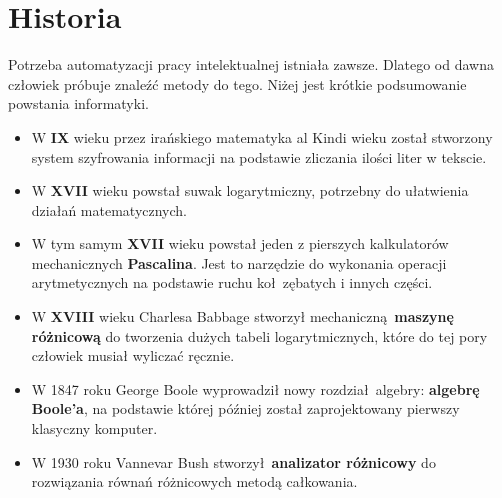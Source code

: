\section{Historia}
	
	Potrzeba automatyzacji pracy intelektualnej istniała zawsze. Dlatego od dawna człowiek próbuje
	znaleźć metody do tego. Niżej jest krótkie podsumowanie powstania informatyki.
	\\

	\begin{itemize}
		\item W \textbf{IX} wieku
			przez irańskiego matematyka al Kindi wieku został stworzony system szyfrowania informacji na
			podstawie zliczania ilości liter w tekscie.

		\item W \textbf{XVII} wieku powstał suwak logarytmiczny, potrzebny do ułatwienia działań
			matematycznych.
		
		\item W tym samym \textbf{XVII} wieku powstał jeden z pierszych kalkulatorów mechanicznych
			\textbf{Pascalina}. Jest to narzędzie do wykonania operacji arytmetycznych na podstawie
			ruchu koł zębatych i innych części.
			
		\item W \textbf{XVIII} wieku Charlesa Babbage stworzył mechaniczną \textbf{maszynę
			różnicową} do tworzenia dużych tabeli logarytmicznych, które do tej pory człowiek
			musiał wyliczać ręcznie.
		
		\item W 1847 roku George Boole wyprowadził nowy rozdział algebry: \textbf{algebrę Boole'a},
			na podstawie której później został zaprojektowany pierwszy klasyczny komputer.
		
		\item W 1930 roku Vannevar Bush stworzył \textbf{analizator różnicowy} do rozwiązania
			równań różnicowych metodą całkowania.
	\end{itemize}